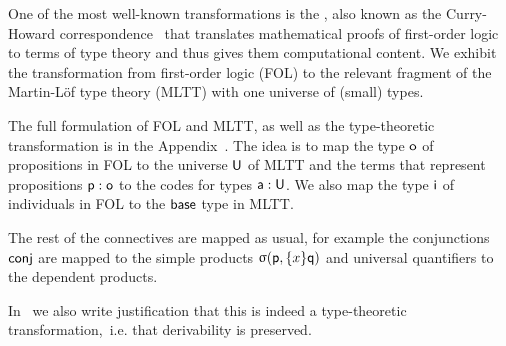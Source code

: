 \begin{example}
    One of the most well-known transformations is the , also known as the Curry-Howard correspondence~ that translates mathematical proofs of first-order logic to terms of type theory and thus gives them computational content.
    We exhibit the transformation from first-order logic (FOL) to the relevant fragment of the Martin-Löf type theory (MLTT)  with one universe of (small) types.

    The full formulation of FOL and MLTT, as well as the type-theoretic transformation is in the Appendix~.
    The idea is to map the type $\mathsf{o}$ of propositions in FOL to the universe $\mathsf{U}$ of MLTT and the terms that represent propositions $\mathsf{p} : \mathsf{o}$ to the codes
    for types $\mathsf{a} : \mathsf{U}$. We also map the type $\mathsf{i}$ of individuals in FOL to the $\mathsf{base}$ type in MLTT.

    The rest of the connectives are mapped as usual, for example the conjunctions $\mathsf{conj}$ are mapped to the simple products $\upsigma(\mathsf{p}, \{x\} \mathsf{q})$ and universal quantifiers to the dependent products.

    In~ we also write justification that this is indeed a type-theoretic transformation,~i.e. that derivability is preserved.
\end{example}


